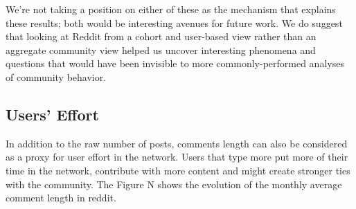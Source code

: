 We're not taking a position on either of these as the mechanism that explains these results; both would be interesting avenues for future work.  We do suggest that looking at Reddit from a cohort and user-based view rather than an aggregate community view helped us uncover interesting phenomena and questions that would have been invisible to more commonly-performed analyses of community behavior. 






\subsection{Users' Effort}

In addition to the raw number of posts, comments length can also be considered as a proxy for user effort in the network. Users that type more put more of their time in the network, contribute with more content and might create stronger ties with the community. The Figure N shows the evolution of the monthly average comment length in reddit.

